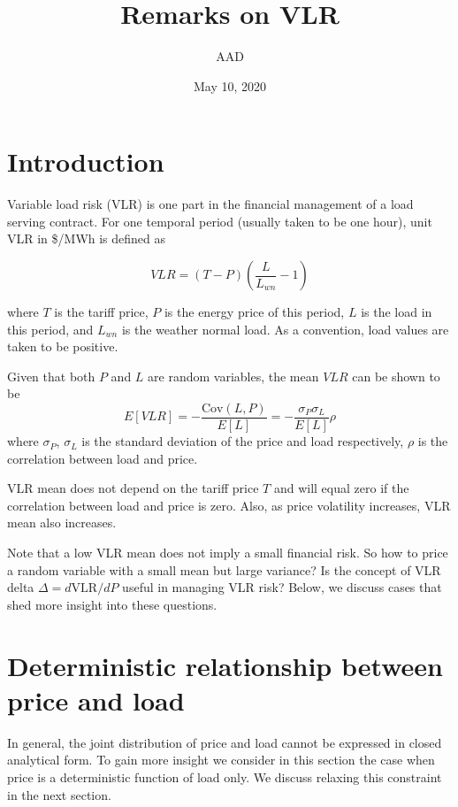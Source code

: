 \documentclass[12pt]{article}
\begin{document}
\title{Remarks on VLR}
\author{AAD}
\date{May 10, 2020}
\maketitle

\section{Introduction}

Variable load risk (VLR) is one part in the financial management of
a load serving contract.  For one temporal period (usually taken to be
one hour), unit VLR in \$/MWh is defined as 
 
\begin{equation}
  VLR = (T - P)(\frac{L}{L_{wn}} - 1)
\end{equation}

where $T$ is the tariff price, $P$ is the energy price of this period,
$L$ is the load in this period, and $L_{wn}$ is the weather normal
load.  As a convention, load values are taken to be positive. 

Given that both $P$ and $L$ are random variables, the mean $VLR$ can
be shown to be
\begin{equation}
  E[VLR] = -\frac{\mathrm{Cov}(L,P)}{E[L]} = -\frac{\sigma_P \sigma_L}{E[L]} \rho
\end{equation}
where $\sigma_P$, $\sigma_L$ is the standard deviation of the price
and load respectively, $\rho$ is the correlation between load and
price.

VLR mean does not depend on the tariff price $T$ and will equal zero
if the correlation between load and price is zero.  Also, as price
volatility increases, VLR mean also increases.

Note that a low VLR mean does not imply a small financial risk.  So
how to price a random variable with a small mean but large variance?
Is the concept of VLR delta $\Delta = d\mathrm{VLR}/dP$ useful in managing VLR
risk?  Below, we discuss cases that shed more insight into these
questions.

\section{Deterministic relationship between price and load}

In general, the joint distribution of price and load cannot be
expressed in closed analytical form.  To gain more insight we consider
in this section the case when price is a deterministic function of
load only.  We discuss relaxing this constraint in the next section.
\end{document}
